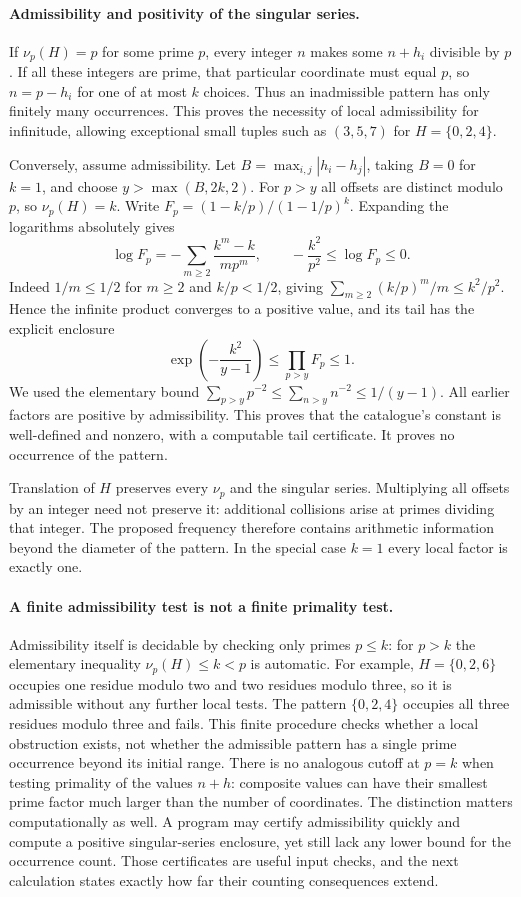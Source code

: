 \documentclass[11pt]{article}
\begin{document}
\paragraph{Admissibility and positivity of the singular series.}
If $\nu_p(H)=p$ for some prime $p$, every integer $n$ makes some
$n+h_i$ divisible by $p$. If all these integers are prime, that particular
coordinate must equal $p$, so $n=p-h_i$ for one of at most $k$ choices.
Thus an inadmissible pattern has only finitely many occurrences. This
proves the necessity of local admissibility for infinitude, allowing
exceptional small tuples such as $(3,5,7)$ for $H=\{0,2,4\}$.

Conversely, assume admissibility. Let
$B=\max_{i,j}|h_i-h_j|$, taking $B=0$ for $k=1$, and choose
$y>\max(B,2k,2)$. For $p>y$ all offsets are distinct modulo $p$, so
$\nu_p(H)=k$. Write
$F_p=(1-k/p)/(1-1/p)^k$. Expanding the logarithms absolutely gives
\[
 \log F_p=-\sum_{m\ge2}\frac{k^m-k}{mp^m},\qquad
 -\frac{k^2}{p^2}\le\log F_p\le0.
\]
Indeed $1/m\le1/2$ for $m\ge2$ and $k/p<1/2$, giving
$\sum_{m\ge2}(k/p)^m/m\le k^2/p^2$. Hence the infinite product
converges to a positive value, and its tail has the explicit enclosure
\begin{equation}\label{ra:18:tail}
 \exp\!\left(-\frac{k^2}{y-1}\right)
 \le\prod_{p>y}F_p\le1.
\end{equation}
We used the elementary bound
$\sum_{p>y}p^{-2}\le\sum_{n>y}n^{-2}\le1/(y-1)$.
All earlier factors are positive by admissibility. This proves that the
catalogue's constant is well-defined and nonzero, with a computable
tail certificate. It proves no occurrence of the pattern.

Translation of $H$ preserves every $\nu_p$ and the singular series.
Multiplying all offsets by an integer need not preserve it: additional
collisions arise at primes dividing that integer. The proposed frequency
therefore contains arithmetic information beyond the diameter of the
pattern. In the special case $k=1$ every local factor is exactly one.

\paragraph{A finite admissibility test is not a finite primality test.}
Admissibility itself is decidable by checking only primes $p\le k$:
for $p>k$ the elementary inequality $\nu_p(H)\le k<p$ is automatic.
For example, $H=\{0,2,6\}$ occupies one residue modulo two and two
residues modulo three, so it is admissible without any further local
tests. The pattern $\{0,2,4\}$ occupies all three residues modulo three
and fails. This finite procedure checks whether a local obstruction
exists, not whether the admissible pattern has a single prime occurrence
beyond its initial range. There is no analogous cutoff at $p=k$ when
testing primality of the values $n+h$: composite values can have their
smallest prime factor much larger than the number of coordinates.
The distinction matters computationally as well. A program may certify
admissibility quickly and compute a positive singular-series enclosure,
yet still lack any lower bound for the occurrence count. Those certificates
are useful input checks, and the next calculation states exactly how far
their counting consequences extend.
\end{document}
